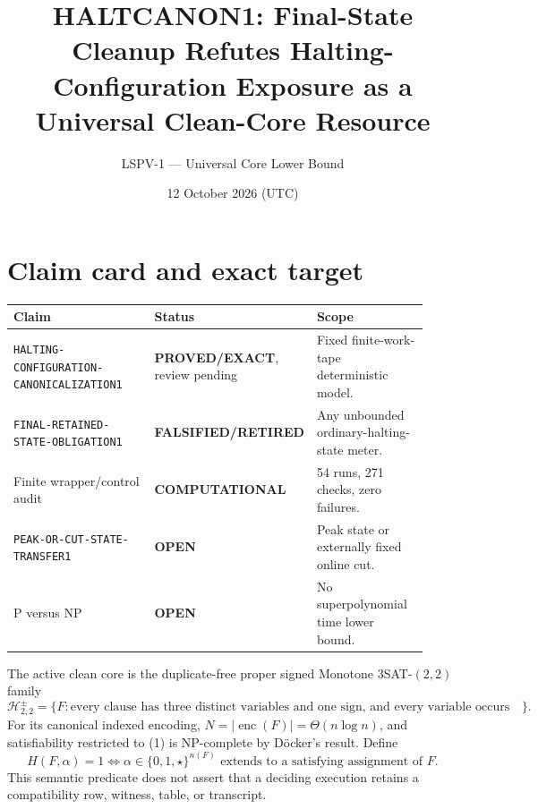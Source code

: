 \documentclass[11pt]{article}
\title{HALTCANON1: Final-State Cleanup Refutes Halting-Configuration Exposure as a Universal Clean-Core Resource}
\author{LSPV-1 --- Universal Core Lower Bound}
\date{12 October 2026 (UTC)}
\newcommand{\EXACT}{\textbf{PROVED/EXACT}}
\newcommand{\COMP}{\textbf{COMPUTATIONAL}}
\newcommand{\OPEN}{\textbf{OPEN}}
\newcommand{\RETIRED}{\textbf{FALSIFIED/RETIRED}}
\begin{document}
\maketitle

\begin{center}
\end{center}

\section{Claim card and exact target}
\begin{center}\small
\begin{tabular}{@{}p{0.43\linewidth}p{0.18\linewidth}p{0.31\linewidth}@{}}
\toprule
Claim & Status & Scope \\ \midrule
\texttt{HALTING-CONFIGURATION-CANONICALIZATION1} & \EXACT, review pending & Fixed finite-work-tape deterministic model.\\
\texttt{FINAL-RETAINED-STATE-OBLIGATION1} & \RETIRED & Any unbounded ordinary-halting-state meter.\\
Finite wrapper/control audit & \COMP & 54 runs, 271 checks, zero failures.\\
\texttt{PEAK-OR-CUT-STATE-TRANSFER1} & \OPEN & Peak state or externally fixed online cut.\\
P versus NP & \OPEN & No superpolynomial time lower bound.\\
\bottomrule
\end{tabular}
\end{center}

The active clean core is the duplicate-free proper signed Monotone
\(3\)SAT-\((2,2)\) family
\[
 \mathcal H_{2,2}^{\pm}
 =\{F:\text{every clause has three distinct variables and one sign,
 and every variable occurs twice in each polarity}\}. \tag{1}
\]
For its canonical indexed encoding,
\(N=|\operatorname{enc}(F)|=\Theta(n\log n)\), and satisfiability restricted
to (1) is NP-complete by D\"ocker's result. Define
\[
 H(F,\alpha)=1\Longleftrightarrow
 \alpha\in\{0,1,\star\}^{n(F)}
 \text{ extends to a satisfying assignment of }F. \tag{2}
\]
This semantic predicate does not assert that a deciding execution retains a
compatibility row, witness, table, or transcript.
\end{document}
